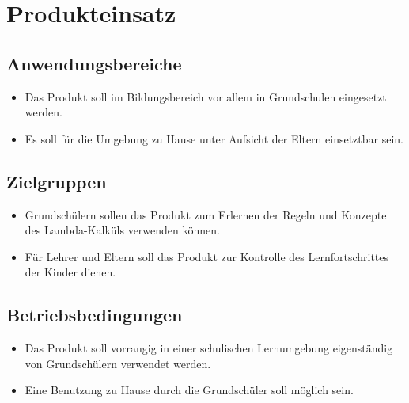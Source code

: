 \section{Produkteinsatz}

\subsection{Anwendungsbereiche}
\begin{itemize}
	\item Das Produkt soll im Bildungsbereich vor allem in Grundschulen eingesetzt werden.
	\item Es soll für die Umgebung zu Hause unter Aufsicht der Eltern einsetztbar sein.
\end{itemize}


\subsection{Zielgruppen}

\begin{itemize}
	\item Grundschülern sollen das Produkt zum Erlernen der Regeln und Konzepte des Lambda-Kalküls verwenden können.
	\item Für Lehrer und Eltern soll das Produkt zur Kontrolle des Lernfortschrittes der Kinder dienen.
\end{itemize}

\subsection{Betriebsbedingungen}
\begin{itemize}
	\item Das Produkt soll vorrangig  in einer schulischen Lernumgebung eigenständig von Grundschülern verwendet werden.
	\item Eine Benutzung zu Hause durch die Grundschüler soll möglich sein.
\end{itemize}
